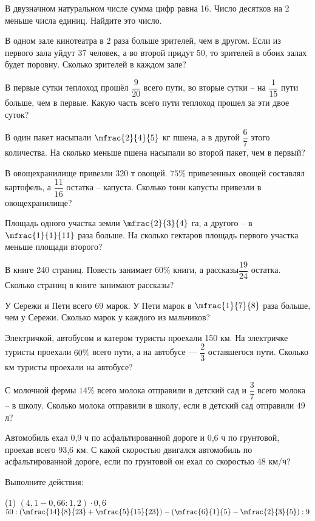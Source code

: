 \begin{class}[number=4]
	\begin{listofex}
		\item В двузначном натуральном числе сумма цифр равна 16. Число десятков на 2 меньше числа единиц. Найдите это число.
		\item В одном зале кинотеатра в 2 раза больше зрителей, чем в другом. Если из первого
		зала уйдут 37 человек, а во второй придут 50, то зрителей в обоих залах будет поровну.
		Сколько зрителей в каждом зале?
		\item В первые сутки теплоход прошёл \( \dfrac{
		9}{20} \)
		всего пути, во вторые сутки – на \( \dfrac{1}{15} \) пути больше, чем в первые. Какую часть всего пути теплоход прошел за эти двое суток?
		\item В один пакет насыпали \( \mfrac{2}{4}{5} \) кг пшена, а в другой \( \dfrac{6}{7} \) этого количества. На сколько меньше пшена насыпали во второй пакет, чем в первый?
		\item В овощехранилище привезли 320 т овощей. \( 75\% \) привезенных овощей составлял картофель, а \( \dfrac{11}{16} \) остатка – капуста. Сколько тонн капусты привезли в овощехранилище?
		\item Площадь одного участка земли \( \mfrac{2}{3}{4} \) га, а другого – в \( \mfrac{1}{1}{11} \) раза больше. На сколько гектаров площадь первого участка меньше площади второго?
		\item В книге 240 страниц. Повесть занимает \( 60\% \) книги, а рассказы\( \dfrac{19}{24} \)
		остатка. Сколько
		страниц в книге занимают рассказы?
		\item У Сережи и Пети всего 69 марок. У Пети марок в \( \mfrac{1}{7}{8} \) раза больше, чем у Сережи. Сколько марок у каждого из мальчиков?
		\item Электричкой, автобусом и катером туристы проехали 150 км. На электричке туристы
		проехали \( 60\% \) всего пути, а на автобусе --- \( \dfrac{2}{3} \) оставшегося пути. Сколько км туристы проехали на автобусе?
		\item  С молочной фермы \( 14\% \) всего молока отправили в детский сад и \( \dfrac{3}{7} \) всего молока – в
		школу. Сколько молока отправили в школу, если в детский сад отправили 49 л?
		\item Автомобиль ехал 0,9 ч по асфальтированной дороге и 0,6 ч по грунтовой, проехав всего 93,6 км. С какой скоростью двигался автомобиль по асфальтированной дороге, если по грунтовой он ехал со скоростью 48 км/ч?
		\newpage
		\item Выполните действия: \begin{tasks}(1)
			\task \( (4,1-0,66:1,2)\cdot0,6 \)
			\task \( 50:\left( \mfrac{14}{8}{23}+\mfrac{5}{15}{23} \right)-\left( \mfrac{6}{1}{5}-\mfrac{2}{3}{5} \right):9 \)
		\end{tasks}
	\end{listofex}
\end{class}

